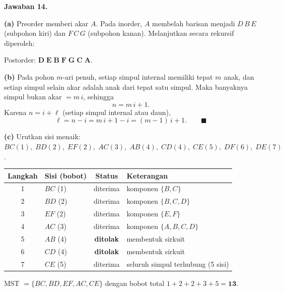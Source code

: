 \documentclass[11pt,a4paper]{article}
\newcommand{\jawab}[1]{\vspace{4pt}\noindent\textbf{Jawaban #1.}\par\nobreak\vspace{2pt}}
\begin{document}
\jawab{14}
\textbf{(a)} Preorder memberi akar $A$. Pada inorder, $A$ membelah barisan menjadi
$D\,B\,E$ (subpohon kiri) dan $F\,C\,G$ (subpohon kanan). Melanjutkan secara
rekursif diperoleh:

\begin{center}
\end{center}

Postorder: $\mathbf{D\;E\;B\;F\;G\;C\;A}$.

\textbf{(b)} Pada pohon $m$-ari penuh, setiap simpul internal memiliki tepat $m$
anak, dan setiap simpul selain akar adalah anak dari tepat satu simpul.
Maka banyaknya simpul bukan akar $= m\,i$, sehingga
\[
n = m\,i + 1 .
\]
Karena $n = i + \ell$ (setiap simpul internal atau daun),
\[
\ell = n - i = m\,i + 1 - i = (m-1)\,i + 1 . \qquad \blacksquare
\]

\textbf{(c)} Urutkan sisi menaik:
$BC(1),\; BD(2),\; EF(2),\; AC(3),\; AB(4),\; CD(4),\; CE(5),\; DF(6),\; DE(7)$.

\begin{center}
\begin{tabular}{clcl}
\toprule
Langkah & Sisi (bobot) & Status & Keterangan\\
\midrule
1 & $BC$ (1) & diterima & komponen $\{B,C\}$\\
2 & $BD$ (2) & diterima & komponen $\{B,C,D\}$\\
3 & $EF$ (2) & diterima & komponen $\{E,F\}$\\
4 & $AC$ (3) & diterima & komponen $\{A,B,C,D\}$\\
5 & $AB$ (4) & \textbf{ditolak} & membentuk sirkuit\\
6 & $CD$ (4) & \textbf{ditolak} & membentuk sirkuit\\
7 & $CE$ (5) & diterima & seluruh simpul terhubung (5 sisi)\\
\bottomrule
\end{tabular}
\end{center}

MST $= \{BC, BD, EF, AC, CE\}$ dengan bobot total
$1 + 2 + 2 + 3 + 5 = \mathbf{13}$.
\end{document}
